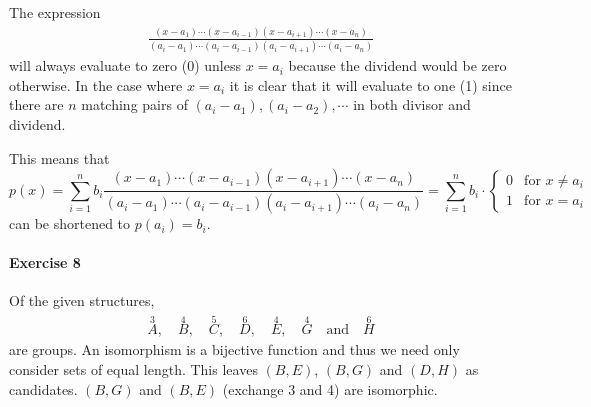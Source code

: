 \documentclass{article}
\begin{document}
The expression
\begin{align*}
    \frac{(x - a_1) \cdots (x - a_{i - 1})(x - a_{i + 1}) \cdots (x - a_n)}{(a_i - a_1) \cdots (a_i - a_{i - 1})(a_i - a_{i + 1}) \cdots (a_i - a_n)}
\end{align*}
will always evaluate to zero (0) unless $x = a_i$ because the dividend would be zero otherwise. In the case where $x = a_i$ it is clear that it will evaluate to one (1) since there are $n$ matching pairs of $(a_i  - a_1), (a_i - a_2), \cdots$ in both divisor and dividend.

This means that
\begin{equation*}
    p(x) = \sum^{n}_{i = 1} b_i \frac{(x - a_1) \cdots (x - a_{i - 1})(x - a_{i + 1}) \cdots (x - a_n)}{(a_i - a_1) \cdots (a_i - a_{i - 1})(a_i - a_{i + 1}) \cdots (a_i - a_n)} = \sum^{n}_{i = 1} b_i \cdot \begin{cases}
        0 & \text{for } x \neq a_i \\
        1 & \text{for } x = a_i
    \end{cases}
\end{equation*}
can be shortened to $p(a_i) = b_i$.

\paragraph{Exercise 8}

Of the given structures,
\begin{align*}
    \overset{3}{A},\quad \overset{4}{B},\quad \overset{5}{C},\quad \overset{6}{D},\quad \overset{4}{E},\quad \overset{4}{G} \quad\text{and}\quad \overset{6}{H}
\end{align*}
are groups. An isomorphism is a bijective function and thus we need only consider sets of equal length. This leaves $(B, E)$, $(B, G)$ and $(D, H)$ as candidates. $(B, G)$ and $(B, E)$ (exchange 3 and 4) are isomorphic.
\end{document}
